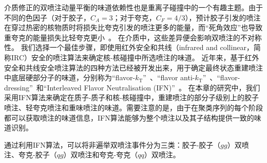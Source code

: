 	介质修正的双喷注动量平衡的味道依赖性也是重离子碰撞中的一个有趣主题。由于不同的色因子（对于胶子，$C_A = 3$；对于夸克，$C_F = 4/3$），预计胶子引发的喷注在穿过热密的核物质时将损失比夸克引发的喷注更多的能量，而“死角效应”也导致重夸克的能量损失比轻夸克更小~\parencite{Gyulassy:2003mc,Wang:1998bha,Dokshitzer:2001zm,Zhang:2003wk,Armesto:2003jh,Djordjevic:2003qk}。
	在介质中，这些差异便会影响双喷注的不对称性。
	我们选择一个最佳步骤，即使用红外安全和共线（infrared and collinear，简称IRC）安全的喷注算法来确定核-核碰撞中所选喷注的味道。
	近年来，基于红外安全和共线安全喷注算法的四种方法已经被开发出来，用于确定最终状态重建喷注中底层硬部分子的味道，分别称为“flavor-$k_\text{T}$”~\parencite{Banfi:2006hf}、“flavor anti-$k_\text{T}$”~\parencite{Czakon:2022wam}、“flavor-dressing”~\parencite{Gauld:2022lem}和“Interleaved Flavor Neutralisation (IFN)”~\parencite{Caola:2023wpj}。
	在本章的研究中，我们采用IFN算法来确定在质子-质子和核-核碰撞中，重建喷注的部分子级别上的胶子喷注、轻夸克喷注和重味喷注的味道。需要注意的是，由于在聚类序列的每个阶段都可以获取喷注的味道信息，IFN算法能够为整个喷注以及其子结构提供一致的味道识别。
	
	通过利用IFN算法，可以将非遍举双喷注事件分为三类：胶子-胶子（$gg$）双喷注、夸克-胶子（$qg$）双喷注和夸克-夸克（$qq$）双喷注。
	
